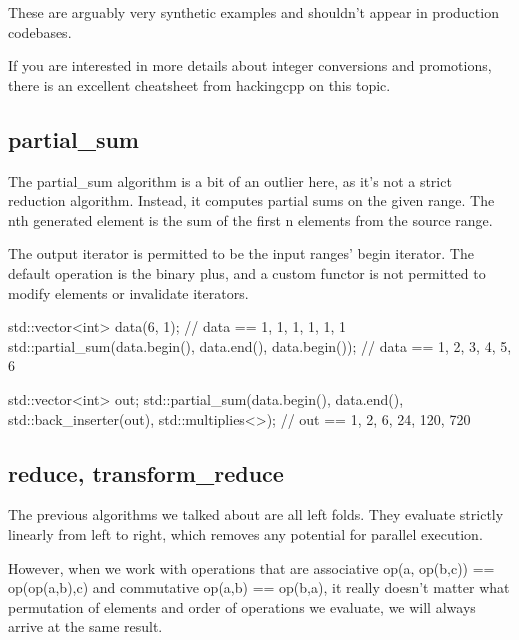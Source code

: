 These are arguably very synthetic examples and shouldn’t appear in production codebases.

If you are interested in more details about integer conversions and promotions, there is an excellent cheatsheet from hackingcpp on this topic.

\subsection{partial\_sum}

The partial\_sum algorithm is a bit of an outlier here, as it’s not a strict reduction algorithm. Instead, it computes partial sums on the given range. The nth generated element is the sum of the first n elements from the source range.



The output iterator is permitted to be the input ranges’ begin iterator. The default operation is the binary plus, and a custom functor is not permitted to modify elements or invalidate iterators.

\begin{box-note}
\begin{cppcode}
std::vector<int> data(6, 1);
// data == {1, 1, 1, 1, 1, 1}
std::partial_sum(data.begin(), data.end(), data.begin());
// data == {1, 2, 3, 4, 5, 6}

std::vector<int> out;
std::partial_sum(data.begin(), data.end(), std::back_inserter(out), std::multiplies<>{});
// out == {1, 2, 6, 24, 120, 720}
\end{cppcode}
\end{box-note}

\subsection{reduce, transform\_reduce}

The previous algorithms we talked about are all left folds. They evaluate strictly linearly from left to right, which removes any potential for parallel execution.

However, when we work with operations that are associative op(a, op(b,c)) == op(op(a,b),c) and commutative op(a,b) == op(b,a), it really doesn’t matter what permutation of elements and order of operations we evaluate, we will always arrive at the same result.

